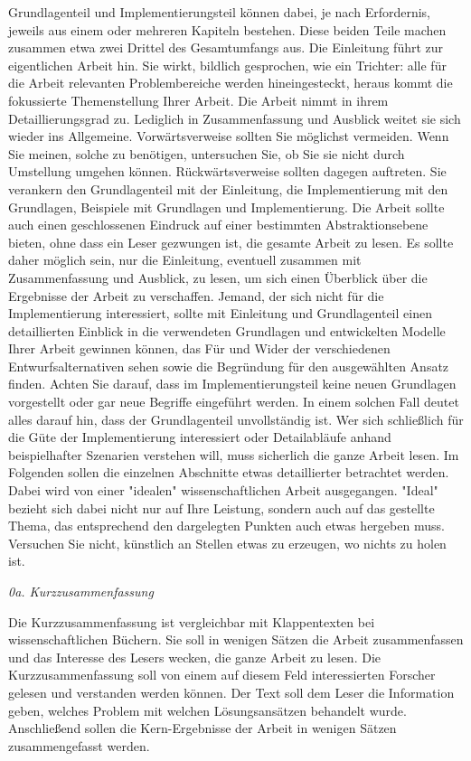 Grundlagenteil und Implementierungsteil können dabei, je nach Erfordernis, jeweils aus einem oder mehreren Kapiteln bestehen. Diese beiden Teile machen zusammen etwa zwei Drittel des Gesamtumfangs aus. Die Einleitung führt zur eigentlichen Arbeit hin. Sie wirkt, bildlich gesprochen, wie ein Trichter: alle für die Arbeit relevanten Problembereiche werden hineingesteckt, heraus kommt die fokussierte Themenstellung Ihrer Arbeit. Die Arbeit nimmt in ihrem Detaillierungsgrad zu. Lediglich in Zusammenfassung und Ausblick weitet sie sich wieder ins Allgemeine. Vorwärtsverweise sollten Sie möglichst vermeiden. Wenn Sie meinen, solche zu benötigen, untersuchen Sie, ob Sie sie nicht durch Umstellung umgehen können. Rückwärtsverweise sollten dagegen auftreten. Sie verankern den Grundlagenteil mit der Einleitung, die Implementierung mit den Grundlagen, Beispiele mit Grundlagen und Implementierung. Die Arbeit sollte auch einen geschlossenen Eindruck auf einer bestimmten Abstraktionsebene bieten, ohne dass ein Leser gezwungen ist, die gesamte Arbeit zu lesen. Es sollte daher möglich sein, nur die Einleitung, eventuell zusammen mit Zusammenfassung und Ausblick, zu lesen, um sich einen Überblick über die Ergebnisse der Arbeit zu verschaffen. Jemand, der sich nicht für die Implementierung interessiert, sollte mit Einleitung und Grundlagenteil einen detaillierten Einblick in die verwendeten Grundlagen und entwickelten Modelle Ihrer Arbeit gewinnen können, das Für und Wider der verschiedenen Entwurfsalternativen sehen sowie die Begründung für den ausgewählten Ansatz finden. Achten Sie darauf, dass im Implementierungsteil keine neuen Grundlagen vorgestellt oder gar neue Begriffe eingeführt werden. In einem solchen Fall deutet alles darauf hin, dass der Grundlagenteil unvollständig ist. Wer sich schließlich für die Güte der Implementierung interessiert oder Detailabläufe anhand beispielhafter Szenarien verstehen will, muss sicherlich die ganze Arbeit lesen.
Im Folgenden sollen die einzelnen Abschnitte etwas detaillierter betrachtet werden. Dabei wird von einer "idealen" wissenschaftlichen Arbeit ausgegangen. "Ideal" bezieht sich dabei nicht nur auf Ihre Leistung, sondern auch auf das gestellte Thema, das entsprechend den dargelegten Punkten auch etwas hergeben muss. Versuchen Sie nicht, künstlich an Stellen etwas zu erzeugen, wo nichts zu holen ist.\newline

\textit{0a. Kurzzusammenfassung}\par
Die Kurzzusammenfassung ist vergleichbar mit Klappentexten bei wissenschaftlichen Büchern. Sie soll in wenigen Sätzen die Arbeit zusammenfassen und das Interesse des Lesers wecken, die ganze Arbeit zu lesen. 
Die Kurzzusammenfassung soll von einem auf diesem Feld interessierten Forscher gelesen und verstanden werden können. Der Text soll dem Leser die Information geben, welches Problem mit welchen Lösungsansätzen behandelt wurde. Anschließend sollen die Kern-Ergebnisse der Arbeit in wenigen Sätzen zusammengefasst werden.

